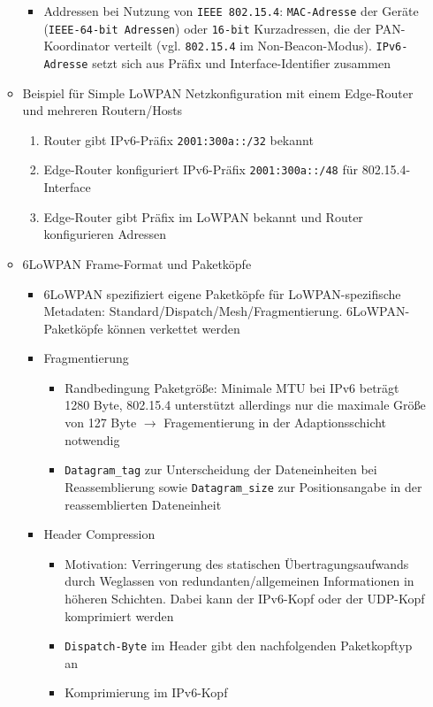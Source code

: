\begin{itemize}
\begin{itemize}
\begin{itemize}
\begin{itemize}
			\end{itemize}
			\item Addressen bei Nutzung von \texttt{IEEE 802.15.4}: \texttt{MAC-Adresse} der Geräte (\texttt{IEEE-64-bit Adressen}) oder \texttt{16-bit} Kurzadressen, die der PAN-Koordinator verteilt (vgl. \texttt{802.15.4} im Non-Beacon-Modus). \texttt{IPv6-Adresse} setzt sich aus Präfix und Interface-Identifier zusammen
		\end{itemize}
		\item Beispiel für Simple LoWPAN Netzkonfiguration mit einem Edge-Router und mehreren Routern/Hosts
		\begin{enumerate}
			\item Router gibt IPv6-Präfix \texttt{2001:300a::/32} bekannt
			\item Edge-Router konfiguriert IPv6-Präfix \texttt{2001:300a::/48} für 802.15.4-Interface
			\item Edge-Router gibt Präfix im LoWPAN bekannt und Router konfigurieren Adressen
		\end{enumerate}
		\item 6LoWPAN Frame-Format und Paketköpfe
		\begin{itemize}
			\item 6LoWPAN spezifiziert eigene Paketköpfe für LoWPAN-spezifische Metadaten: Standard/Dispatch/Mesh/Fragmentierung. 6LoWPAN-Paketköpfe können verkettet werden
			\item Fragmentierung
			\begin{itemize}
				\item Randbedingung Paketgröße: Minimale MTU bei IPv6 beträgt 1280 Byte, 802.15.4 unterstützt allerdings nur die maximale Größe von 127 Byte \(\rightarrow\) Fragementierung in der Adaptionsschicht notwendig
				\item \texttt{Datagram\_tag} zur Unterscheidung der Dateneinheiten bei Reassemblierung sowie \texttt{Datagram\_size} zur Positionsangabe in der reassemblierten Dateneinheit
			\end{itemize}
			\item Header Compression
			\begin{itemize}
				\item Motivation: Verringerung des statischen Übertragungsaufwands durch Weglassen von redundanten/allgemeinen Informationen in höheren Schichten. Dabei kann der IPv6-Kopf oder der UDP-Kopf komprimiert werden
				\item \texttt{Dispatch-Byte} im Header gibt den nachfolgenden Paketkopftyp an
				\item Komprimierung im IPv6-Kopf

\end{itemize}
\end{itemize}
\end{itemize}
\end{itemize}
